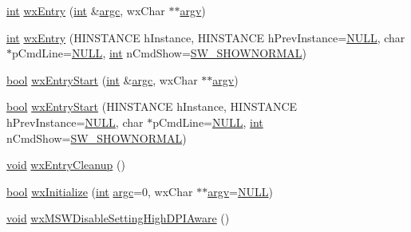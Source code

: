 \begin{DoxyCompactItemize}
\item 
\hyperlink{xmltok_8h_a5a0d4a5641ce434f1d23533f2b2e6653}{int} \hyperlink{group__group__funcmacro__appinitterm_ga7d3eefb35631a5d8dfce97eb17340b21}{wx\+Entry} (\hyperlink{xmltok_8h_a5a0d4a5641ce434f1d23533f2b2e6653}{int} \&\hyperlink{cmdline_8c_aaffeb1bf2056ea44af5b5d0ee4d6ff07}{argc}, wx\+Char $\ast$$\ast$\hyperlink{cmdline_8c_ad407d5ba91709bd9b092003858600723}{argv})
\item 
\hyperlink{xmltok_8h_a5a0d4a5641ce434f1d23533f2b2e6653}{int} \hyperlink{group__group__funcmacro__appinitterm_ga087409a444cb50f75f5819d6d57389af}{wx\+Entry} (H\+I\+N\+S\+T\+A\+N\+CE h\+Instance, H\+I\+N\+S\+T\+A\+N\+CE h\+Prev\+Instance=\hyperlink{px__mixer_8h_a070d2ce7b6bb7e5c05602aa8c308d0c4}{N\+U\+LL}, char $\ast$p\+Cmd\+Line=\hyperlink{px__mixer_8h_a070d2ce7b6bb7e5c05602aa8c308d0c4}{N\+U\+LL}, \hyperlink{xmltok_8h_a5a0d4a5641ce434f1d23533f2b2e6653}{int} n\+Cmd\+Show=\hyperlink{include_2wx_2msw_2init_8h_a001a42e6e438e9531073dba59f091cf6}{S\+W\+\_\+\+S\+H\+O\+W\+N\+O\+R\+M\+AL})
\item 
\hyperlink{mac_2config_2i386_2lib-src_2libsoxr_2soxr-config_8h_abb452686968e48b67397da5f97445f5b}{bool} \hyperlink{group__group__funcmacro__appinitterm_gac81f7fea72a17cc744d8c8785864c78a}{wx\+Entry\+Start} (\hyperlink{xmltok_8h_a5a0d4a5641ce434f1d23533f2b2e6653}{int} \&\hyperlink{cmdline_8c_aaffeb1bf2056ea44af5b5d0ee4d6ff07}{argc}, wx\+Char $\ast$$\ast$\hyperlink{cmdline_8c_ad407d5ba91709bd9b092003858600723}{argv})
\item 
\hyperlink{mac_2config_2i386_2lib-src_2libsoxr_2soxr-config_8h_abb452686968e48b67397da5f97445f5b}{bool} \hyperlink{group__group__funcmacro__appinitterm_gabb589cfa967f83fa867544cd13cd0b53}{wx\+Entry\+Start} (H\+I\+N\+S\+T\+A\+N\+CE h\+Instance, H\+I\+N\+S\+T\+A\+N\+CE h\+Prev\+Instance=\hyperlink{px__mixer_8h_a070d2ce7b6bb7e5c05602aa8c308d0c4}{N\+U\+LL}, char $\ast$p\+Cmd\+Line=\hyperlink{px__mixer_8h_a070d2ce7b6bb7e5c05602aa8c308d0c4}{N\+U\+LL}, \hyperlink{xmltok_8h_a5a0d4a5641ce434f1d23533f2b2e6653}{int} n\+Cmd\+Show=\hyperlink{include_2wx_2msw_2init_8h_a001a42e6e438e9531073dba59f091cf6}{S\+W\+\_\+\+S\+H\+O\+W\+N\+O\+R\+M\+AL})
\item 
\hyperlink{sound_8c_ae35f5844602719cf66324f4de2a658b3}{void} \hyperlink{group__group__funcmacro__appinitterm_gaca1c6e45c8241bb2b16bee8f09401bc8}{wx\+Entry\+Cleanup} ()
\item 
\hyperlink{mac_2config_2i386_2lib-src_2libsoxr_2soxr-config_8h_abb452686968e48b67397da5f97445f5b}{bool} \hyperlink{group__group__funcmacro__appinitterm_ga5f7f9359731d567d05c472caabcda979}{wx\+Initialize} (\hyperlink{xmltok_8h_a5a0d4a5641ce434f1d23533f2b2e6653}{int} \hyperlink{cmdline_8c_aaffeb1bf2056ea44af5b5d0ee4d6ff07}{argc}=0, wx\+Char $\ast$$\ast$\hyperlink{cmdline_8c_ad407d5ba91709bd9b092003858600723}{argv}=\hyperlink{px__mixer_8h_a070d2ce7b6bb7e5c05602aa8c308d0c4}{N\+U\+LL})
\item 
\hyperlink{sound_8c_ae35f5844602719cf66324f4de2a658b3}{void} \hyperlink{group__group__funcmacro__appinitterm_ga6b923aa6dc04b811e0112a55b291e569}{wx\+M\+S\+W\+Disable\+Setting\+High\+D\+P\+I\+Aware} ()
\end{DoxyCompactItemize}


